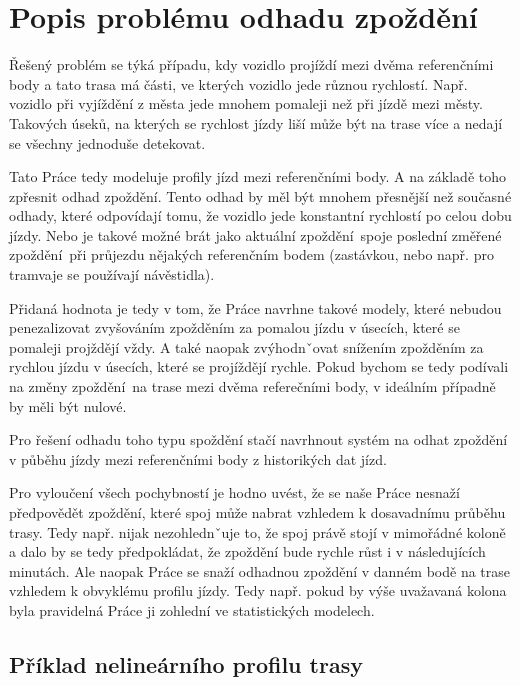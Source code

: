 \section{Popis problému odhadu zpoždění}

Řešený problém se týká případu, kdy vozidlo projíždí mezi dvěma referenčními body a tato trasa má části, ve kterých vozidlo jede různou rychlostí. Např. vozidlo při vyjíždění z města jede mnohem pomaleji než při jízdě mezi městy. Takových úseků, na kterých se rychlost jízdy liší může být na trase více a nedají se všechny jednoduše detekovat.

\bigbreak

Tato Práce tedy modeluje profily jízd mezi referenčními body. A na základě toho zpřesnit odhad zpoždění. Tento odhad by měl být mnohem přesnější než současné odhady, které odpovídají tomu, že vozidlo jede konstantní rychlostí po celou dobu jízdy. Nebo je takové možné brát jako aktuální zpoždění spoje poslední změřené zpoždění při průjezdu nějakých referenčním bodem (zastávkou, nebo např. pro tramvaje se používají návěstidla).

\bigbreak

Přidaná hodnota je tedy v tom, že Práce navrhne takové modely, které nebudou penezalizovat zvyšováním zpožděním za pomalou jízdu v úsecích, které se pomaleji projždějí vždy. A také naopak zvýhodnˇovat snížením zpožděním za rychlou jízdu v úsecích, které se projíždějí rychle. Pokud bychom se tedy podívali na změny zpoždění na trase mezi dvěma referečními body, v ideálním případně by měli být nulové.

\bigbreak

Pro řešení odhadu toho typu spoždění stačí navrhnout systém na odhat zpoždění v půběhu jízdy mezi referenčními body z historikých dat jízd.

\bigbreak

Pro vyloučení všech pochybností je hodno uvést, že se naše Práce nesnaží předpovědět zpoždění, které spoj může nabrat vzhledem k dosavadnímu průběhu trasy. Tedy např. nijak nezohlednˇuje to, že spoj právě stojí v mimořádné koloně a dalo by se tedy předpokládat, že zpoždění bude rychle růst i v následujících minutách. Ale naopak Práce se snaží odhadnou zpoždění v danném bodě na trase vzhledem k obvyklému profilu jízdy. Tedy např. pokud by výše uvažavaná kolona byla pravidelná Práce ji zohlední ve statistických modelech.


\subsection{Příklad nelineárního profilu trasy} \label{subsection:priklad_nelinearni_trasa}

